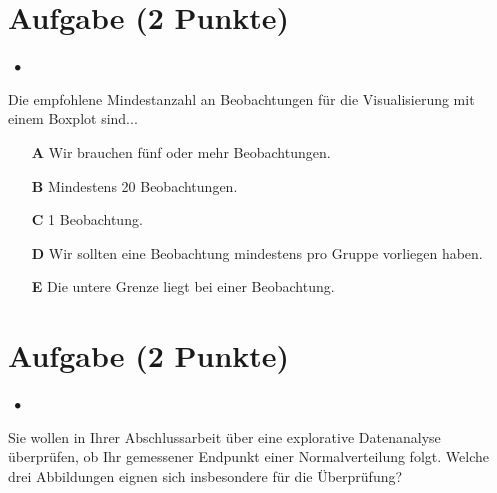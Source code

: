 \documentclass[a4paper, 9pt]{scrartcl}\usepackage[]{graphicx}\usepackage[]{xcolor}
\begin{document}
\section{Aufgabe \hfill (2 Punkte)}

\ifcollection
\begin{flushright}
\tiny\vspace{-2Ex}
\textbf{\examinhaltstart}
\exammodulestatversuch $\;\bullet$
\exammodulebiostat
\vspace{-1Ex}
\end{flushright}
\fi




Die empfohlene Mindestanzahl an Beobachtungen für die Visualisierung mit einem Boxplot sind...



\begin{enumerate}
\item [\textbf{A} \msquare] Wir brauchen fünf oder mehr Beobachtungen.
\item [\textbf{B} \msquare] Mindestens 20 Beobachtungen.
\item [\textbf{C} \msquare] 1 Beobachtung.
\item [\textbf{D} \msquare] Wir sollten eine Beobachtung mindestens pro Gruppe vorliegen haben.
\item [\textbf{E} \msquare] Die untere Grenze liegt bei einer Beobachtung.
\end{enumerate}

\section{Aufgabe \hfill (2 Punkte)}

\ifcollection
\begin{flushright}
\tiny\vspace{-2Ex}
\textbf{\examinhaltstart}
\exammodulestatversuch $\;\bullet$
\exammodulebiostat
\vspace{-1Ex}
\end{flushright}
\fi




Sie wollen in Ihrer Abschlussarbeit über eine explorative Datenanalyse überprüfen, ob Ihr gemessener Endpunkt einer Normalverteilung folgt. Welche drei Abbildungen eignen sich insbesondere für die Überprüfung?
\end{document}
